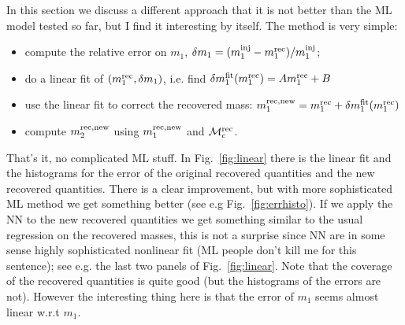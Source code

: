 \documentclass[prd,aps,twocolumn,a4paper,showkeys,nofootinbib]{revtex4-1}
\def\Mc{{\cal M}_c}
\begin{document}
In this section we discuss a different approach that it is not better than the ML
model tested so far, but I find it interesting by itself. 
The method is very simple: 
\begin{itemize}
\item compute the relative error on $m_1$, 
$\delta m_1 = (m_1^{\rm inj}-m_1^{\rm rec})/m_1^{\rm inj}$;
\item do a linear fit of $(m_1^{\rm rec}, \delta m_1)$, i.e. find
$\delta m_1^{\rm fit}(m_1^{\rm rec}) = A m_1^{\rm rec} + B$
\item use the linear fit to correct the recovered mass: 
$m_1^{\rm rec, new} = m_1^{\rm rec} + \delta m_1^{\rm fit}(m_1^{\rm rec})$
\item compute $m_2^{\rm rec, new}$ using $m_1^{\rm rec, new}$ and $\Mc^{\rm rec}$. 
\end{itemize} 
That's it, no complicated ML stuff. 
In Fig.~\ref{fig:linear} there is the linear fit and the histograms for 
the error of the original recovered quantities and the new recovered quantities. There 
is a clear improvement, but with more sophisticated ML method we get something better 
(see e.g Fig.~\ref{fig:errhisto}).
If we apply the NN to the new recovered quantities we get something similar 
to the usual regression on the recovered masses, this is not a surprise
since NN are in some sense highly sophisticated nonlinear fit (ML people don't kill me
for this sentence); see e.g. the last two panels of Fig.~\ref{fig:linear}.
Note that the coverage of the recovered quantities is quite good (but the histograms 
of the errors are not).
However the interesting thing here is that the error of $m_1$ seems almost linear w.r.t $m_1$.
\end{document}
